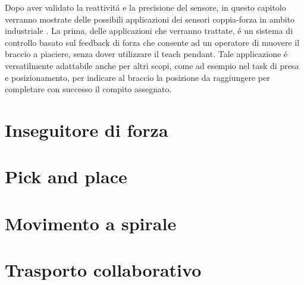 Dopo aver validato la reattivit\'{a} e la precisione del sensore, in questo capitolo verranno mostrate delle possibili applicazioni 
dei sensori coppia-forza in ambito industriale \cite{applications}. 
La prima, delle applicazioni che verranno trattate, \'{e} un sistema di controllo basato sul feedback di forza che consente ad un 
operatore di muovere il braccio a piaciere, senza dover utilizzare 
il teach pendant. Tale applicazione \'{e} versatilmente adattabile anche per altri scopi,  
come ad esempio nel task di presa e posizionamento, per indicare al braccio la posizione da raggiungere per completare 
con successo il compito assegnato.

\section{Inseguitore di forza} \label{sec:force_follower}


\section{Pick and place} \label{sec:pick_place}


\section{Movimento a spirale}


\section{Trasporto collaborativo}
